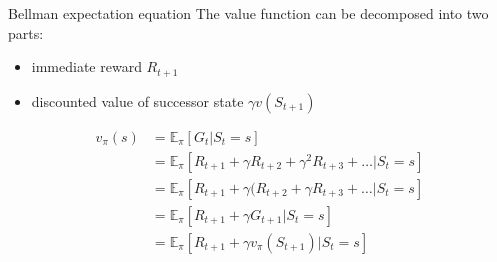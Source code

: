 \bgroup
\begin{frame}{Bellman expectation equation}
The value function can be decomposed into two parts:
\begin{itemize}
\item immediate reward $R_{t+1}$
\item discounted value of successor state $\gamma v(S_{t+1})$
\end{itemize}
\begin{align*}
v_{\pi}(s) &= \mathbb{E}_{\pi}[G_t | S_t = s]\\
&= \mathbb{E}_{\pi} [R_{t+1} + \gamma R_{t+2} + \gamma^2 R_{t+3} + \ldots | S_t = s]\\
&= \mathbb{E}_{\pi}[R_{t+1} + \gamma(R_{t+2} + \gamma R_{t+3} + \ldots | S_t = s]\\
&= \mathbb{E}_{\pi}[R_{t+1} + \gamma G_{t+1} | S_t = s]\\
&= \mathbb{E}_{\pi}[R_{t+1} + \gamma v_{\pi}(S_{t+1}) | S_t = s]
\end{align*}
\end{frame}
\egroup